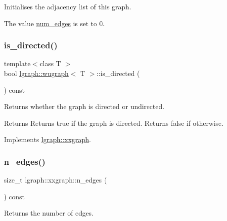 Initialises the adjacency list of this graph. 

The value \hyperlink{classlgraph_1_1xxgraph_a6765a9a3be42f6e0f824635c593b35d7}{num\+\_\+edges} is set to 0. \mbox{\label{classlgraph_1_1wugraph_a1614f4e23aa04055c64816c001cd093d}} 
\subsubsection{\texorpdfstring{is\+\_\+directed()}{is\_directed()}}
{\footnotesize\ttfamily template$<$class T $>$ \\
bool \hyperlink{classlgraph_1_1wugraph}{lgraph\+::wugraph}$<$ T $>$\+::is\+\_\+directed (\begin{DoxyParamCaption}{ }\end{DoxyParamCaption}) const\hspace{0.3cm}{\ttfamily [virtual]}}



Returns whether the graph is directed or undirected. 

\begin{DoxyReturn}{Returns}
Returns true if the graph is directed. Returns false if otherwise. 
\end{DoxyReturn}


Implements \hyperlink{classlgraph_1_1xxgraph_a0a606d77cbbb2efa7056b82c3b8c395c}{lgraph\+::xxgraph}.

\mbox{\label{classlgraph_1_1xxgraph_af00bce8b07a42754601d1e3bebe2c1fa}} 
\subsubsection{\texorpdfstring{n\+\_\+edges()}{n\_edges()}}
{\footnotesize\ttfamily size\+\_\+t lgraph\+::xxgraph\+::n\+\_\+edges (\begin{DoxyParamCaption}{ }\end{DoxyParamCaption}) const\hspace{0.3cm}{\ttfamily [inherited]}}



Returns the number of edges. 

